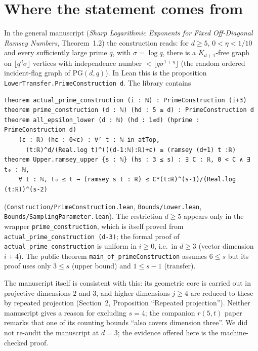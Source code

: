 \documentclass[11pt]{amsart}
\theoremstyle{remark}
\begin{document}
\section{Where the statement comes from}
In the general manuscript (\emph{Sharp Logarithmic Exponents for Fixed
Off-Diagonal Ramsey Numbers}, Theorem~1.2) the construction reads: for
$d\ge5$, $0<\eta<1/10$ and every sufficiently large prime $q$, with
$\sigma=\log q$, there is a $K_{d+1}$-free graph on
$\lfloor q^d\sigma\rfloor$ vertices with independence number
$<\lfloor q\sigma^{1+\eta}\rfloor$ (the random ordered incident-flag graph
of $\mathrm{PG}(d,q)$). In Lean this is the proposition
\texttt{LowerTransfer.PrimeConstruction d}. The library contains
\begin{Verbatim}
theorem actual_prime_construction (i : ℕ) : PrimeConstruction (i+3)
theorem prime_construction (d : ℕ) (hd : 5 ≤ d) : PrimeConstruction d
theorem all_epsilon_lower (d : ℕ) (hd : 1≤d) (hprime : PrimeConstruction d)
    (ε : ℝ) (hε : 0<ε) : ∀ᶠ t : ℕ in atTop,
      (t:ℝ)^d/(Real.log t)^(((d-1:ℕ):ℝ)+ε) ≤ (ramsey (d+1) t :ℝ)
theorem Upper.ramsey_upper {s : ℕ} (hs : 3 ≤ s) : ∃ C : ℝ, 0 < C ∧ ∃ t₀ : ℕ,
    ∀ t : ℕ, t₀ ≤ t → (ramsey s t : ℝ) ≤ C*(t:ℝ)^(s-1)/(Real.log (t:ℝ))^(s-2)
\end{Verbatim}
(\texttt{Construction/PrimeConstruction.lean},
\texttt{Bounds/Lower.lean}, \texttt{Bounds/SamplingParameter.lean}).
The restriction $d\ge5$ appears only in the wrapper
\texttt{prime\_construction}, which is itself proved from
\texttt{actual\_prime\_construction (d-3)}; the formal proof of
\texttt{actual\_prime\_construction} is uniform in $i\ge0$, i.e.\ in
$d\ge3$ (vector dimension $i+4$). The public theorem
\texttt{main\_of\_primeConstruction} assumes $6\le s$ but its proof uses
only $3\le s$ (upper bound) and $1\le s-1$ (transfer).

The manuscript itself is consistent with this: its geometric core is
carried out in projective dimensions $2$ and $3$, and higher dimensions
$j\ge4$ are reduced to these by repeated projection
(Section~2, Proposition ``Repeated projection''). Neither manuscript
gives a reason for excluding $s=4$; the companion $r(5,t)$ paper remarks
that one of its counting bounds ``also covers dimension three''.
We did not re-audit the manuscript at $d=3$; the evidence offered here is
the machine-checked proof.
\end{document}
